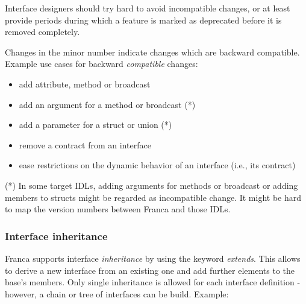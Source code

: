 \documentclass[a4paper,10pt]{scrreprt}
\newlength{\XdocItemIndent}
\begin{document}
Interface designers should try hard to avoid incompatible changes, or at least provide
periods during which a feature is marked as deprecated before it is removed completely. 

Changes in the minor number indicate changes which are backward compatible.
Example use cases for backward \textit{compatible} changes:
\setlength{\XdocItemIndent}{\textwidth}
\begin{itemize}
\addtolength{\XdocItemIndent}{-2.5em}
\item \begin{minipage}[t]{\XdocItemIndent}
add attribute, method or broadcast

\end{minipage}
\item \begin{minipage}[t]{\XdocItemIndent}
add an argument for a method or broadcast (*)

\end{minipage}
\item \begin{minipage}[t]{\XdocItemIndent}
add a parameter for a struct or union (*)

\end{minipage}
\item \begin{minipage}[t]{\XdocItemIndent}
remove a contract from an interface

\end{minipage}
\item \begin{minipage}[t]{\XdocItemIndent}
ease restrictions on the dynamic behavior of an interface (i.e., its contract)

\end{minipage}
\end{itemize}
\addtolength{\XdocItemIndent}{2.5em}

(*) In some target IDLs, adding arguments for methods or broadcast or adding members to
structs might be regarded as incompatible change. It might be hard to map the version numbers
between Franca and those IDLs.

\subsubsection{Interface inheritance}
\label{FIDL_Interface_Basic_Inheritance}
Franca supports interface \textit{inheritance} by using the keyword \textit{extends}.
This allows to derive a new interface from an existing one and add
further elements to the base's members. Only single inheritance is allowed for
each interface definition - however, a chain or tree of interfaces can be build. Example:
\end{document}

